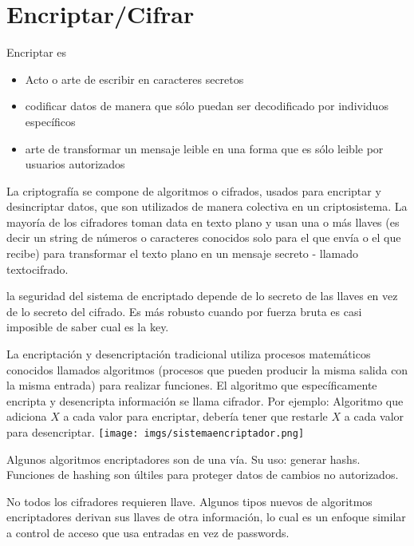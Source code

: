 \section{Encriptar/Cifrar}
Encriptar es 
\begin{itemize}
    \item Acto o arte de escribir en caracteres secretos
    \item codificar datos de manera que sólo puedan ser decodificado por individuos específicos
    \item arte de transformar un mensaje leible en una forma que es sólo leible por usuarios autorizados
\end{itemize}
La criptografía se compone de algoritmos o cifrados, usados para encriptar y desincriptar datos, que son utilizados de manera colectiva en un criptosistema. La mayoría de los cifradores toman data en texto plano y usan una o más llaves (es decir un string de números o caracteres conocidos solo para el que envía o el que recibe) para transformar el texto plano en un mensaje secreto - llamado textocifrado. 
\begin{tcolorbox}[colback=gray!5!white,colframe=orange!60!gray,title=¿es seguro?]
la seguridad del sistema de encriptado depende de lo secreto de las llaves en vez de lo secreto del cifrado. Es más robusto cuando por fuerza bruta es casi imposible de saber cual es la key.  
\end{tcolorbox}



La encriptación y desencriptación tradicional utiliza procesos matemáticos conocidos llamados algoritmos  (procesos que pueden producir la misma salida con la misma entrada) para realizar funciones. 
El algoritmo que específicamente encripta y desencripta información se llama cifrador. 
Por ejemplo: Algoritmo que adiciona $X$ a cada valor para encriptar, debería tener que restarle $X$ a cada valor para desencriptar. 
\texttt{[image: imgs/sistemaencriptador.png]}

\begin{tcolorbox}[colback=gray!5!white,colframe=orange!60!gray,title= Todo algoritmo encriptador tiene un desencriptador?]
Algunos algoritmos encriptadores son de una vía. Su uso: generar hashs. Funciones de hashing son últiles para proteger datos de cambios no autorizados. 
\end{tcolorbox}

\begin{tcolorbox}[colback=gray!5!white,colframe=orange!60!gray,title= Todos requieren key?]
No todos los cifradores requieren llave. Algunos tipos nuevos de algoritmos encriptadores derivan sus llaves de otra información, lo cual es un enfoque similar a control de acceso que usa entradas en vez de passwords. %
\end{tcolorbox} 


